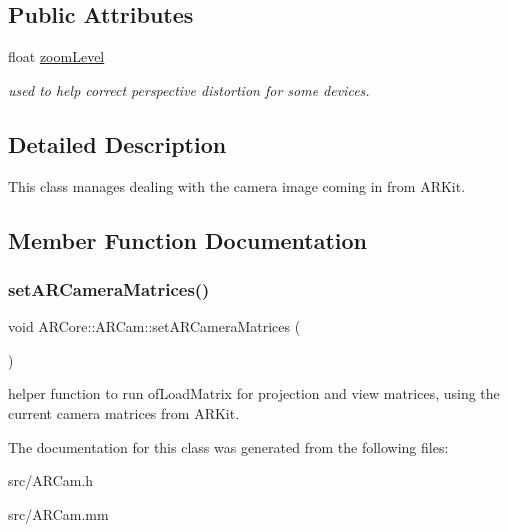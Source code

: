 \subsection*{Public Attributes}
\begin{DoxyCompactItemize}
\item 
\mbox{\label{class_a_r_core_1_1_a_r_cam_ac17d3b7fd12f51b2c54b7241efd36cd4}} 
float \hyperlink{class_a_r_core_1_1_a_r_cam_ac17d3b7fd12f51b2c54b7241efd36cd4}{zoom\+Level}
\begin{DoxyCompactList}\small\item\em used to help correct perspective distortion for some devices. \end{DoxyCompactList}\end{DoxyCompactItemize}


\subsection{Detailed Description}
This class manages dealing with the camera image coming in from A\+R\+Kit. 

\subsection{Member Function Documentation}
\mbox{\label{class_a_r_core_1_1_a_r_cam_ac554b8254ea4a22f122f25542694dafa}} 
\subsubsection{\texorpdfstring{set\+A\+R\+Camera\+Matrices()}{setARCameraMatrices()}}
{\footnotesize\ttfamily void A\+R\+Core\+::\+A\+R\+Cam\+::set\+A\+R\+Camera\+Matrices (\begin{DoxyParamCaption}{ }\end{DoxyParamCaption})}

helper function to run of\+Load\+Matrix for projection and view matrices, using the current camera matrices from A\+R\+Kit. 

The documentation for this class was generated from the following files\+:\begin{DoxyCompactItemize}
\item 
src/A\+R\+Cam.\+h\item 
src/A\+R\+Cam.\+mm\end{DoxyCompactItemize}

